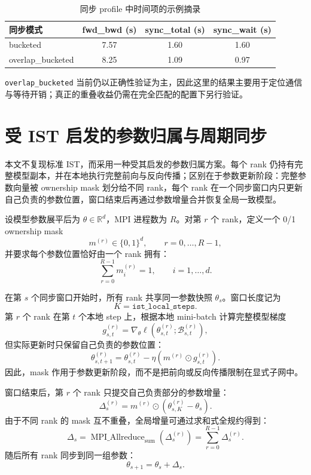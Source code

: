 \documentclass[a4paper,11pt,oneside]{article}
\begin{document}
\begin{table}[h]
\centering
\begin{tabular}{lccc}
\hline
同步模式 & fwd\_bwd (s) & sync\_total (s) & sync\_wait (s) \\
\hline
bucketed         & 7.57 & 1.60 & 1.60 \\
overlap\_bucketed & 8.25 & 1.09 & 0.97 \\
\hline
\end{tabular}
\caption{同步 profile 中时间项的示例摘录}
\label{tab:mpi_profile}
\end{table}

\texttt{overlap\_bucketed} 当前仍以正确性验证为主，因此这里的结果主要用于定位通信与等待开销；真正的重叠收益仍需在完全匹配的配置下另行验证。

\section{受 IST 启发的参数归属与周期同步}

本文不复现标准 IST，而采用一种受其启发的参数归属方案。每个 rank 仍持有完整模型副本，并在本地执行完整前向与反向传播；区别在于参数更新阶段：完整参数向量被 ownership mask 划分给不同 rank，每个 rank 在一个同步窗口内只更新自己负责的参数位置，窗口结束后再通过参数增量合并恢复全局一致模型。

设模型参数展平后为 \(\theta \in \mathbb{R}^d\)，MPI 进程数为 \(R\)。对第 \(r\) 个 rank，定义一个 0/1 ownership mask
\[
m^{(r)} \in \{0,1\}^d, \qquad r=0,\ldots,R-1,
\]
并要求每个参数位置恰好由一个 rank 拥有：
\[
\sum_{r=0}^{R-1} m_i^{(r)} = 1, \qquad i=1,\ldots,d.
\]

在第 \(s\) 个同步窗口开始时，所有 rank 共享同一参数快照 \(\theta_s\)。窗口长度记为
\[
K = \texttt{ist\_local\_steps}.
\]
第 \(r\) 个 rank 在第 \(t\) 个本地 step 上，根据本地 mini-batch 计算完整模型梯度
\[
g_{s,t}^{(r)}
=
\nabla_\theta \ell\!\left(\theta_{s,t}^{(r)};\mathcal{B}_{s,t}^{(r)}\right),
\]
但实际更新时只保留自己负责的参数位置：
\[
\theta_{s,t+1}^{(r)}
=
\theta_{s,t}^{(r)}
-
\eta \left(m^{(r)} \odot g_{s,t}^{(r)}\right).
\]
因此，mask 作用于参数更新阶段，而不是把前向或反向传播限制在显式子网中。

窗口结束后，第 \(r\) 个 rank 只提交自己负责部分的参数增量：
\[
\Delta_s^{(r)}
=
m^{(r)} \odot
\left(\theta_{s,K}^{(r)}-\theta_s\right).
\]
由于不同 rank 的 mask 互不重叠，全局增量可通过求和式全规约得到：
\[
\Delta_s
=
\operatorname{MPI\_Allreduce}_{\mathrm{sum}}
\left(\Delta_s^{(r)}\right)
=
\sum_{r=0}^{R-1}\Delta_s^{(r)}.
\]
随后所有 rank 同步到同一组参数：
\[
\theta_{s+1} = \theta_s + \Delta_s.
\]
\end{document}
